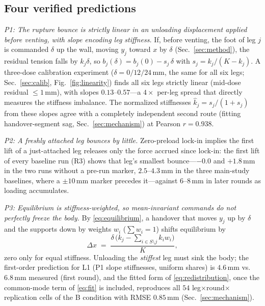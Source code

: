 \documentclass[journal]{IEEEtran}
\begin{document}
\subsection{Four verified predictions}
\label{sec:predictions}

\emph{P1: The rupture bounce is strictly linear in an unloading
displacement applied before venting, with slope encoding leg
stiffness.} If, before venting, the foot of leg $j$ is commanded
$\delta$ up the wall, moving $y_j$ toward $x$ by $\delta$
(Sec.~\ref{sec:method}), the residual tension falls by $k_j\delta$, so
$b_j(\delta) = b_j(0) - s_j\,\delta$ with
$s_j = k_j/(K-k_j)$. A three-dose calibration experiment
($\delta = 0/12/24$\,mm, the same for all six legs; Sec.~\ref{sec:calib},
Fig.~\ref{fig:linearity}) finds all six legs strictly linear (mid-dose
residual $\le1$\,mm), with slopes $0.13$--$0.57$---a $4\times$ per-leg
spread that directly measures the stiffness imbalance. The normalized
stiffnesses $\hat{k}_j = s_j/(1+s_j)$ from these slopes agree with a
completely independent second route (fitting handover-segment sag,
Sec.~\ref{sec:mechanism}) at Pearson $r=0.938$.

\emph{P2: A freshly attached leg bounces by little.} Zero-preload
lock-in implies the first lift of a just-attached leg releases only the
force accrued since lock-in: the first lift of every baseline run (R3)
shows that leg's smallest bounce---$-0.0$ and $+1.8$\,mm in the two
runs without a pre-run marker, $2.5$--$4.3$\,mm in the three main-study
baselines, where a $\pm10$\,mm marker precedes it---against
$6$--$8$\,mm in later rounds as loading accumulates.

\emph{P3: Equilibrium is stiffness-weighted, so mean-invariant commands
do not perfectly freeze the body.} By \eqref{eq:equilibrium}, a
handover that moves $y_j$ up by $\delta$ and the supports down by
weights $w_i$ ($\sum w_i = 1$) shifts equilibrium by
\begin{equation}
\Delta x \;=\; \frac{\delta\,\bigl(k_j - \sum_{i\in S\setminus j} k_i
w_i\bigr)}{K},
\label{eq:redistribution}
\end{equation}
zero only for equal stiffness. Unloading the \emph{stiffest} leg must
sink the body; the first-order prediction for L1 (P1 slope
stiffnesses, uniform shares) is $4.6$\,mm vs.\ $6.8$\,mm measured
(first round), and the fitted form of \eqref{eq:redistribution}, once
the common-mode term of \eqref{eq:fit} is included, reproduces all $54$
leg$\times$round$\times$replication cells of the B condition with RMSE
$0.85$\,mm (Sec.~\ref{sec:mechanism}).
\end{document}
